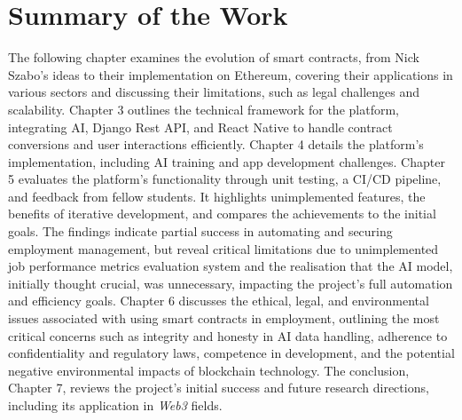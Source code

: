 \section{Summary of the Work}

The following chapter examines the evolution of smart contracts, from Nick Szabo's ideas to their implementation on Ethereum, covering their applications in various sectors and discussing their limitations, such as legal challenges and scalability. Chapter 3 outlines the technical framework for the platform, integrating AI, Django Rest API, and React Native to handle contract conversions and user interactions efficiently. Chapter 4 details the platform's implementation, including AI training and app development challenges. Chapter 5 evaluates the platform's functionality through unit testing, a CI/CD pipeline, and feedback from fellow students. It highlights unimplemented features, the benefits of iterative development, and compares the achievements to the initial goals. The findings indicate partial success in automating and securing employment management, but reveal critical limitations due to unimplemented job performance metrics evaluation system and the realisation that the AI model, initially thought crucial, was unnecessary, impacting the project's full automation and efficiency goals. Chapter 6 discusses the ethical, legal, and environmental issues associated with using smart contracts in employment, outlining the most critical concerns such as integrity and honesty in AI data handling, adherence to confidentiality and regulatory laws, competence in development, and the potential negative environmental impacts of blockchain technology. The conclusion, Chapter 7, reviews the project's initial success and future research directions, including its application in \textit{Web3} fields.
